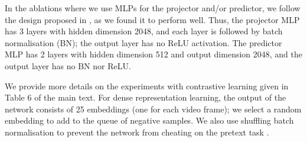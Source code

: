 \documentclass[10pt,twocolumn,letterpaper]{article}
\begin{document}
\begin{description}[wide,itemindent=\labelsep]
\item[Details on MLPs used in ablations.] In the ablations where we use MLPs for the projector and/or predictor, we follow the design proposed in \cite{chen2021exploring}, as we found it to perform well. Thus, the projector MLP has 3 layers with hidden dimension 2048, and each layer is followed by batch normalisation (BN); the output layer has no ReLU activation. The predictor MLP has 2 layers with hidden dimension 512 and output dimension 2048, and the output layer has no BN nor ReLU.

\item[Further details on contrastive experiments.]
We provide more details on the experiments with contrastive learning given in Table 6 of the main text. For dense representation learning, the output of the network consists of 25 embeddings (one for each video frame); we select a random embedding to add to the queue of negative samples. We also use shuffling batch normalisation to prevent the network from cheating on the pretext task \cite{he2020momentum}.

\end{description}
\end{document}
